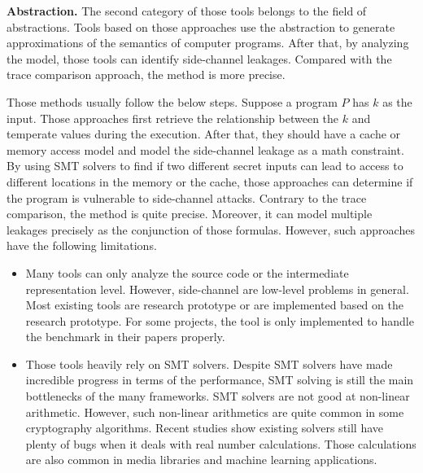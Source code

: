 \textbf{Abstraction.} The second category of those tools belongs to the field of abstractions. Tools based on those approaches use the abstraction to generate approximations of the semantics of computer programs. After that, by analyzing the model, those tools can identify side-channel leakages. Compared with the trace comparison approach, the method is more precise.

Those methods usually follow the below steps. Suppose a program $P$ has $k$ as the input. Those approaches first retrieve the relationship between the $k$ and temperate values during the execution. After that, they should have a cache or memory access model and model the side-channel leakage as a math constraint. By using SMT solvers to find if two different secret inputs can lead to access to different locations in the memory or the cache, those approaches can determine if the program is vulnerable to side-channel attacks.
Contrary to the trace comparison, the method is quite precise. Moreover, it can model multiple leakages precisely as the conjunction of those formulas. However, such approaches have the following limitations.

\begin{itemize}
    \item Many tools can only analyze the source code or the intermediate representation level. However, side-channel are low-level problems in general.  Most existing tools are research prototype or are implemented based on the research prototype. For some projects, the tool is only implemented to handle the benchmark in their papers properly. 
    \item Those tools heavily rely on SMT solvers. Despite SMT solvers have made incredible progress in terms of the performance, SMT solving is still the main bottlenecks of the many frameworks. SMT solvers are not good at non-linear arithmetic. However, such non-linear arithmetics are quite common in some cryptography algorithms.  Recent studies show existing solvers still have plenty of bugs when it deals with real number calculations. Those calculations are also common in media libraries and machine learning applications.
\end{itemize}

